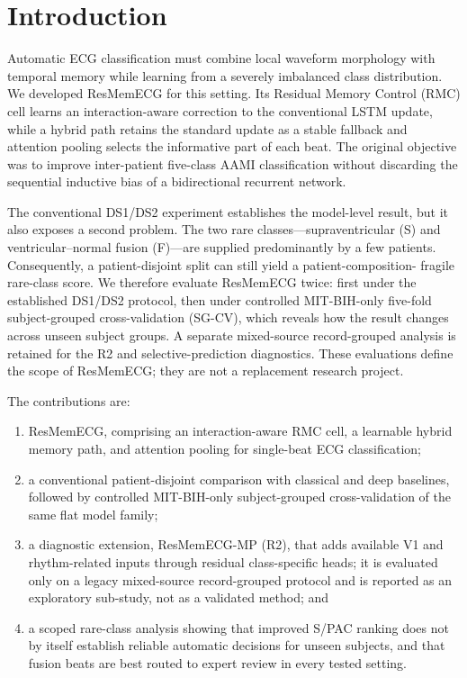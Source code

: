 \documentclass[pdflatex,sn-mathphys-num]{sn-jnl}
\begin{document}
\section{Introduction}
Automatic ECG classification must combine local waveform morphology with
temporal memory while learning from a severely imbalanced class distribution.
We developed ResMemECG for this setting. Its Residual Memory Control (RMC) cell
learns an interaction-aware correction to the conventional LSTM update, while a
hybrid path retains the standard update as a stable fallback and attention
pooling selects the informative part of each beat. The original objective was
to improve inter-patient five-class AAMI classification without discarding the
sequential inductive bias of a bidirectional recurrent network.

The conventional DS1/DS2 experiment establishes the model-level result, but it
also exposes a second problem. The two rare classes---supraventricular (S) and
ventricular--normal fusion (F)---are supplied predominantly by a few patients.
Consequently, a patient-disjoint split can still yield a patient-composition-
fragile rare-class score. We therefore evaluate ResMemECG twice: first under
the established DS1/DS2 protocol, then under controlled MIT-BIH-only five-fold
subject-grouped cross-validation (SG-CV), which reveals how the result changes
across unseen subject groups. A separate mixed-source record-grouped analysis
is retained for the R2 and selective-prediction diagnostics. These evaluations
define the scope of ResMemECG; they are not a replacement research project.

The contributions are:
\begin{enumerate}
  \item ResMemECG, comprising an interaction-aware RMC cell, a learnable hybrid
  memory path, and attention pooling for single-beat ECG classification;
  \item a conventional patient-disjoint comparison with classical and deep
  baselines, followed by controlled MIT-BIH-only subject-grouped cross-validation
  of the same flat model family;
  \item a diagnostic extension, ResMemECG-MP (R2), that adds available V1 and
  rhythm-related inputs through residual class-specific heads; it is evaluated
  only on a legacy mixed-source record-grouped protocol and is reported as an
  exploratory sub-study, not as a validated method; and
  \item a scoped rare-class analysis showing that improved S/PAC ranking does
  not by itself establish reliable automatic decisions for unseen subjects, and
  that fusion beats are best routed to expert review in every tested setting.
\end{enumerate}
\end{document}
